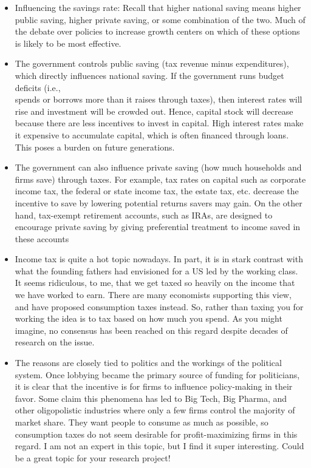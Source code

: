 \documentclass[10pt]{article}
\begin{document}
\begin{itemize}
  \item Influencing the savings rate: Recall that higher national saving means higher public saving, higher private saving, or some combination of the two. Much of the debate over policies to increase growth centers on which of these options is likely to be most effective.
  \item The government controls public saving (tax revenue minus expenditures), which directly influences national saving. If the government runs budget deficits (i.e.,\\
spends or borrows more than it raises through taxes), then interest rates will rise and investment will be crowded out. Hence, capital stock will decrease because there are less incentives to invest in capital. High interest rates make it expensive to accumulate capital, which is often financed through loans. This poses a burden on future generations.
  \item The government can also influence private saving (how much households and firms save) through taxes. For example, tax rates on capital such as corporate income tax, the federal or state income tax, the estate tax, etc. decrease the incentive to save by lowering potential returns savers may gain. On the other hand, tax-exempt retirement accounts, such as IRAs, are designed to encourage private saving by giving preferential treatment to income saved in these accounts
  \item Income tax is quite a hot topic nowadays. In part, it is in stark contrast with what the founding fathers had envisioned for a US led by the working class. It seems ridiculous, to me, that we get taxed so heavily on the income that we have worked to earn. There are many economists supporting this view, and have proposed consumption taxes instead. So, rather than taxing you for working the idea is to tax based on how much you spend. As you might imagine, no consensus has been reached on this regard despite decades of research on the issue.
  \item The reasons are closely tied to politics and the workings of the political system. Once lobbying became the primary source of funding for politicians, it is clear that the incentive is for firms to influence policy-making in their favor. Some claim this phenomena has led to Big Tech, Big Pharma, and other oligopolistic industries where only a few firms control the majority of market share. They want people to consume as much as possible, so consumption taxes do not seem desirable for profit-maximizing firms in this regard. I am not an expert in this topic, but I find it super interesting. Could be a great topic for your research project!

\end{itemize}
\end{document}
